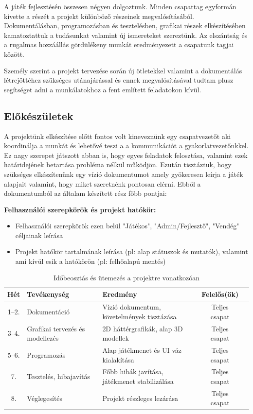 \documentclass[12pt,a4paper]{article}
\begin{document}
A játék fejlesztésén összesen négyen dolgoztunk. Minden csapattag egyformán kivette a részét a projekt különböző részeinek megvalósításából. Dokumentálásban, programozásban és tesztelésben, grafikai részek elkészítésében kamatoztattuk a tudásunkat valamint új ismereteket szereztünk. Az elszántság és a rugalmas hozzáállás gördülékeny munkát eredményezett a csapatunk tagjai között.

Személy szerint a projekt tervezése során új ötletekkel valamint a dokumentálás létrejöttéhez szükséges utánajárással és ennek megvalósításával tudtam plusz segítséget adni a munkálatokhoz a fent említett feladatokon kívül.


\subsection{Előkészületek}

A projektünk elkészítése előtt fontos volt kineveznünk egy csapatvezetőt aki koordinálja a munkát és lehetővé teszi a a kommunikációt a gyakorlatvezetőnkkel. Ez nagy szerepet játszott abban is, hogy egyes feladatok felosztása, valamint ezek határidejének betartása probléma nélkül működjön.  Ezután tisztáztuk, hogy szükséges elkészítenünk egy vízió dokumentumot amely gyökeresen leírja a játék alapjait valamint, hogy miket szeretnénk pontosan elérni.
Ebből a dokumentumból az általam készített rész főbb pontjai:


\textbf{Felhasználói szerepkörök és projekt hatókör:}
\begin{itemize}
    \item Felhasználói szerepkörök ezen belül "Játékos", "Admin/Fejlesztő", "Vendég" céljainak leírása
    \item Projekt hatókör tartalmának leírása (pl: alap státuszok és mutatók), valamint ami kívül esik a hatókörön (pl: felhőalapú mentés)
\end{itemize}



\begin{table}[h!]
\centering
\caption{Időbeosztás és ütemezés a projektre vonatkozóan}
\label{tab:project_schedule}
\begin{tabular}{|c|p{4cm}|p{6cm}|c|c|}
\hline
\textbf{Hét} & \textbf{Tevékenység} & \textbf{Eredmény} & \textbf{Felelős(ök)} \\ \hline
1–2. & Dokumentáció & Vízió dokumentum, követelmények tisztázása & Teljes csapat \\ \hline
3–4. & Grafikai tervezés és modellezés & 2D háttérgrafikák, alap 3D modellek & Teljes csapat \\ \hline
5–6. & Programozás & Alap játékmenet és UI váz kialakítása & Teljes csapat \\ \hline
7. & Tesztelés, hibajavítás & Főbb hibák javítása, játékmenet stabilizálása & Teljes csapat  \\ \hline
8. & Véglegesítés & Projekt részleges lezárása & Teljes csapat \\ \hline
\end{tabular}
\end{table}
\end{document}
